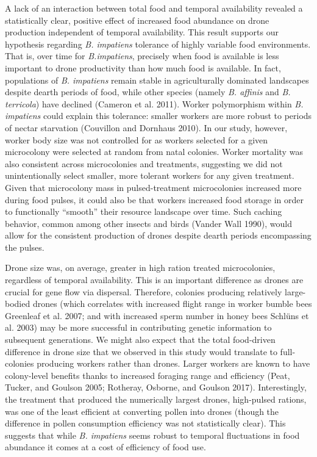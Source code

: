\documentclass[11pt,]{article}
\begin{document}
A lack of an interaction between total food and temporal availability
revealed a statistically clear, positive effect of increased food
abundance on drone production independent of temporal availability. This
result supports our hypothesis regarding \emph{B. impatiens} tolerance
of highly variable food environments. That is, over time for
\emph{B.impatiens}, precisely when food is available is less important
to drone productivity than how much food is available. In fact,
populations of \emph{B. impatiens} remain stable in agriculturally
dominated landscapes despite dearth periods of food, while other species
(namely \emph{B. affinis} and \emph{B. terricola}) have declined
(Cameron et al. 2011). Worker polymorphism within \emph{B. impatiens}
could explain this tolerance: smaller workers are more robust to periods
of nectar starvation (Couvillon and Dornhaus 2010). In our study,
however, worker body size was not controlled for as workers selected for
a given microcolony were selected at random from natal colonies. Worker
mortality was also consistent across microcolonies and treatments,
suggesting we did not unintentionally select smaller, more tolerant
workers for any given treatment. Given that microcolony mass in
pulsed-treatment microcolonies increased more during food pulses, it
could also be that workers increased food storage in order to
functionally ``smooth'' their resource landscape over time. Such caching
behavior, common among other insects and birds (Vander Wall 1990), would
allow for the consistent production of drones despite dearth periods
encompassing the pulses.

Drone size was, on average, greater in high ration treated
microcolonies, regardless of temporal availability. This is an important
difference as drones are crucial for gene flow via dispersal. Therefore,
colonies producing relatively large-bodied drones (which correlates with
increased flight range in worker bumble bees Greenleaf et al. 2007; and
with increased sperm number in honey bees Schlüns et al. 2003) may be
more successful in contributing genetic information to subsequent
generations. We might also expect that the total food-driven difference
in drone size that we observed in this study would translate to
full-colonies producing workers rather than drones. Larger workers are
known to have colony-level benefits thanks to increased foraging range
and efficiency (Peat, Tucker, and Goulson 2005; Rotheray, Osborne, and
Goulson 2017). Interestingly, the treatment that produced the
numerically largest drones, high-pulsed rations, was one of the least
efficient at converting pollen into drones (though the difference in
pollen consumption efficiency was not statistically clear). This
suggests that while \emph{B. impatiens} seems robust to temporal
fluctuations in food abundance it comes at a cost of efficiency of food
use.
\end{document}
